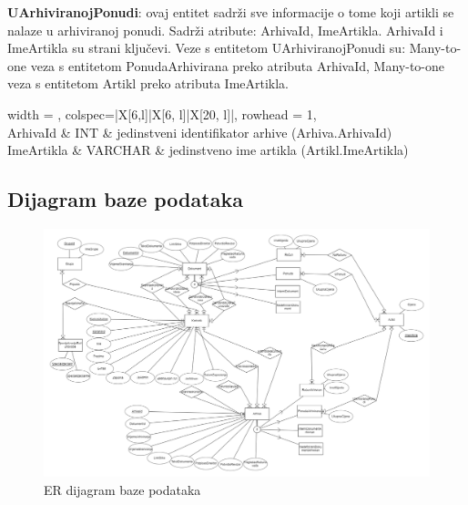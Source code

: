 				\textbf{UArhiviranojPonudi}: ovaj entitet sadrži sve informacije o tome koji artikli se nalaze u arhiviranoj ponudi. Sadrži atribute: ArhivaId, ImeArtikla. ArhivaId i ImeArtikla su strani ključevi.
				Veze s entitetom UArhiviranojPonudi su: Many-to-one veza s entitetom PonudaArhivirana preko atributa ArhivaId,
				Many-to-one veza s entitetom Artikl preko atributa ImeArtikla.
				
				
				\begin{longtblr}[
					label=none,
					entry=none
					]{
						width = \textwidth,
						colspec={|X[6,l]|X[6, l]|X[20, l]|}, 
						rowhead = 1,
					} %
					\hline {}	 \\ \hline[3pt]
					ArhivaId & INT	&  	jedinstveni identifikator arhive (Arhiva.ArhivaId)  	\\ \hline
					ImeArtikla & VARCHAR	&  	jedinstveno ime artikla (Artikl.ImeArtikla)  	\\ \hline
				\end{longtblr}
				
				
			
			\subsection{Dijagram baze podataka}

			\begin{figure}[H]
				\includegraphics[width=\textwidth]{slike/ER_dijagram.png} %
				\caption{ER dijagram baze podataka}
				\label{fig:er_diagram} %
			\end{figure}

